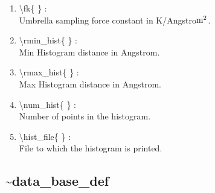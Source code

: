 \documentclass[12pt,titlepage]{article}
\begin{document}
\begin{enumerate}
 \vspace{0.15in} 
 \item  \textbackslash{}fk\{ \} : \\               
    Umbrella sampling force constant in K/Angstro${\rm m}^2$.

 \vspace{0.15in} 
 \item  \textbackslash{}rmin\_hist\{ \} : \\         
    Min Histogram distance in Angstrom.

 \vspace{0.15in} 
 \item  \textbackslash{}rmax\_hist\{ \} : \\         
    Max Histogram distance in Angstrom.

 \vspace{0.15in} 
 \item  \textbackslash{}num\_hist\{ \} : \\         
    Number of points in the histogram.
 
 \vspace{0.15in} 
 \item  \textbackslash{}hist\_file\{ \} : \\        
    File to which the histogram is printed.

\end{enumerate}

\newpage
\subsection*{\bf \~{}data\_base\_def}
\end{document}

